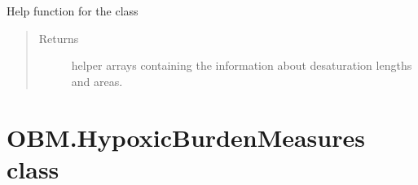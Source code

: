 \documentclass[letterpaper,10pt,english]{sphinxmanual}
\begin{document}
\begin{fulllineitems}
\begin{fulllineitems}
\begin{quote}
\begin{description}
\end{description}\end{quote}

\end{fulllineitems}


\begin{fulllineitems}
\label{\detokenize{OBM:OBM.DesaturationsMeasures.DesaturationsMeasures.desat_embedding}}
Help function for the class
\begin{quote}\begin{description}
\item[{Returns}] \leavevmode
helper arrays containing the information about desaturation lengths and areas.

\end{description}\end{quote}

\end{fulllineitems}


\end{fulllineitems}



\section{OBM.HypoxicBurdenMeasures class}
\label{\detokenize{OBM:module-OBM.HypoxicBurdenMeasures}}\label{\detokenize{OBM:obm-hypoxicburdenmeasures-class}}
\end{document}
